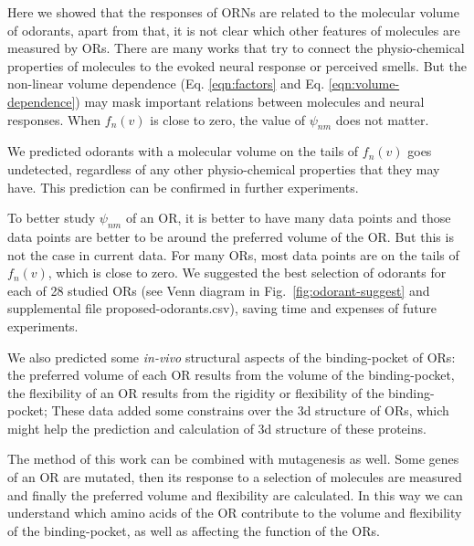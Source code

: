 \documentclass[11pt]{paper} %
\newcommand{\numberofreceptors}{ 28 }
\begin{document}
Here we showed that the responses of ORNs are related to the molecular volume of odorants, 
apart from that, it is not clear which other features of molecules are measured by ORs. 
There are many works that try to connect the physio-chemical properties of molecules to the evoked neural response or perceived smells.
But the non-linear volume dependence (Eq. \ref{eqn:factors} and Eq. \ref{eqn:volume-dependence})  
may mask important relations between molecules and neural responses.
When $f_n(v)$ is close to zero, 
the value of $\psi_{nm}$ does not matter. 

We predicted odorants with a molecular volume on the tails of $f_n(v)$ goes undetected, 
regardless of any other physio-chemical properties that they may have. 
This prediction can be confirmed in further experiments. 

To better study $\psi_{nm}$ of an OR, 
it is better to have many data points and those data points are better to be around the preferred volume of the OR.
But this is not the case in current data. 
For many ORs, 
most data points are on the tails of $f_n(v)$, which is close to zero.
We suggested the best selection of odorants for each of \numberofreceptors studied ORs 
(see Venn diagram in Fig.~\ref{fig:odorant-suggest} and supplemental file proposed-odorants.csv), 
saving time and expenses of future experiments. 


We also predicted some {\it in-vivo} structural aspects of  the binding-pocket of ORs:
the preferred volume of each OR results from the volume of the binding-pocket,
the flexibility of an OR results from the rigidity or flexibility of the binding-pocket; 
These data added some constrains over the 3d structure of ORs, 
which might help the prediction and calculation of 3d structure of these proteins. 

The method of this work can be combined with mutagenesis as well. 
Some genes of an OR are mutated, 
then its response to a selection of molecules are measured and finally the preferred volume and flexibility are calculated.
In this way we can understand which amino acids of the OR contribute to the volume and flexibility of the binding-pocket, 
as well as affecting the function of the ORs.
\end{document}
